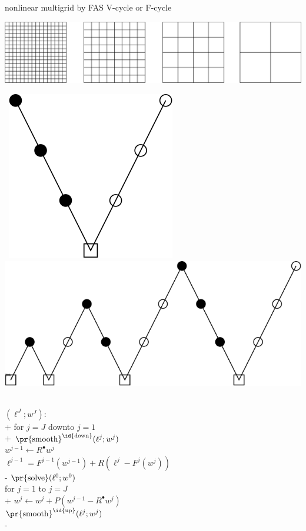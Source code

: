 \documentclass[svgnames,
               hyperref={colorlinks,citecolor=DeepPink4,linkcolor=FireBrick,urlcolor=Maroon},
               usepdftitle=false]  %
               {beamer}
\newcommand{\iR}{R^{\bullet}}
\begin{document}
\begin{frame}{nonlinear multigrid by FAS V-cycle or F-cycle}

\bigskip

\includegraphics[height=0.15\textheight]{images/mg-grids.png}

\bigskip

\hfill \mbox{
\includegraphics[height=0.15\textheight]{images/mg-vcycle.png} \quad
\includegraphics[height=0.15\textheight]{images/mg-fcycle.png}
}

\vspace{-3mm}

{\small
\begin{pseudo}
$(\ell^J;w^J)$: \\+
    for $j=J$ downto $j=1$ \\+
      $\text{\pr{smooth}}^{\text{\id{down}}}(\ell^j; w^j)$ \\
      $w^{j-1} \gets \iR w^j$ \\
      $\ell^{j-1} = F^{j-1}(w^{j-1}) + R \left(\ell^j - F^j(w^j)\right)$ \\-
    $\text{\pr{solve}}(\ell^0;w^0)$ \\
    for $j=1$ to $j=J$ \\+
      $w^j \gets w^j + P (w^{j-1} - \iR w^j)$ \\
      $\text{\pr{smooth}}^{\text{\id{up}}}(\ell^j;w^j)$ \\-
\end{pseudo}
}
\end{frame}
\end{document}
